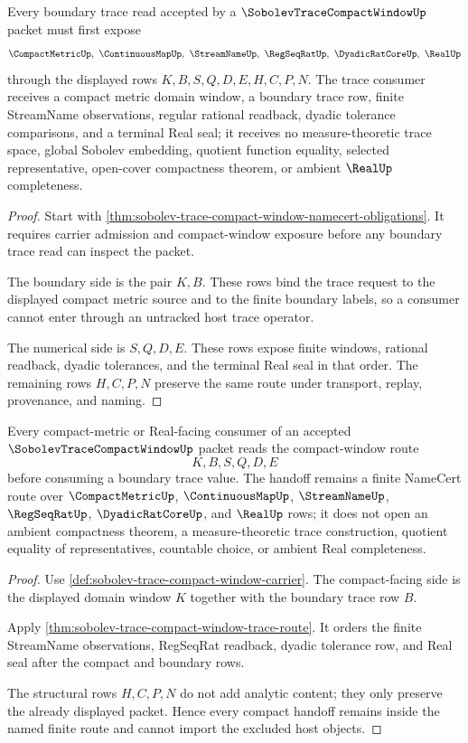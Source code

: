 \begin{theorem}
\label{thm:sobolev-trace-compact-window-trace-route}
Every boundary trace read accepted by a $\SobolevTraceCompactWindowUp$ packet must first expose
$$
\CompactMetricUp,\ \ContinuousMapUp,\ \StreamNameUp,\ \RegSeqRatUp,\ \DyadicRatCoreUp,\ \RealUp
$$
through the displayed rows $K,B,S,Q,D,E,H,C,P,N$. The trace consumer receives a compact metric domain window, a boundary trace row, finite StreamName observations, regular rational readback, dyadic tolerance comparisons, and a terminal Real seal; it receives no measure-theoretic trace space, global Sobolev embedding, quotient function equality, selected representative, open-cover compactness theorem, or ambient $\RealUp$ completeness.
\end{theorem}
\begin{proof}
Start with \autoref{thm:sobolev-trace-compact-window-namecert-obligations}. It requires carrier admission and compact-window exposure before any boundary trace read can inspect the packet.

The boundary side is the pair $K,B$. These rows bind the trace request to the displayed compact metric source and to the finite boundary labels, so a consumer cannot enter through an untracked host trace operator.

The numerical side is $S,Q,D,E$. These rows expose finite windows, rational readback, dyadic tolerances, and the terminal Real seal in that order. The remaining rows $H,C,P,N$ preserve the same route under transport, replay, provenance, and naming.
\end{proof}

\begin{theorem}
\label{thm:sobolev-trace-compact-window-compact-handoff}
Every compact-metric or Real-facing consumer of an accepted $\SobolevTraceCompactWindowUp$ packet reads the compact-window route
$$
K,B,S,Q,D,E
$$
before consuming a boundary trace value. The handoff remains a finite NameCert route over $\CompactMetricUp$, $\ContinuousMapUp$, $\StreamNameUp$, $\RegSeqRatUp$, $\DyadicRatCoreUp$, and $\RealUp$ rows; it does not open an ambient compactness theorem, a measure-theoretic trace construction, quotient equality of representatives, countable choice, or ambient Real completeness.
\end{theorem}
\begin{proof}
Use \autoref{def:sobolev-trace-compact-window-carrier}. The compact-facing side is the displayed domain window $K$ together with the boundary trace row $B$.

Apply \autoref{thm:sobolev-trace-compact-window-trace-route}. It orders the finite StreamName observations, RegSeqRat readback, dyadic tolerance row, and Real seal after the compact and boundary rows.

The structural rows $H,C,P,N$ do not add analytic content; they only preserve the already displayed packet. Hence every compact handoff remains inside the named finite route and cannot import the excluded host objects.
\end{proof}

